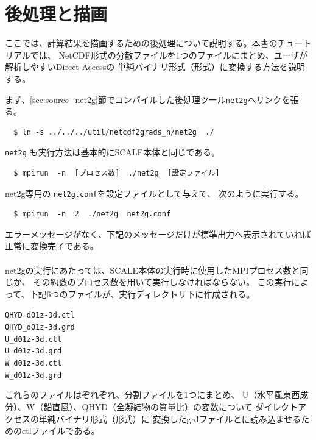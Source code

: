 \section{後処理と描画} \label{sec:ideal_exp_net2g}
ここでは、計算結果を描画するための後処理について説明する。本書のチュートリアルでは、
NetCDF形式の分散ファイルを1つのファイルにまとめ、ユーザが解析しやすいDirect-Accessの
単純バイナリ形式（\grads 形式）に変換する方法を説明する。

まず、\ref{sec:source_net2g}節でコンパイルした後処理ツール\verb|net2g|へリンクを張る。
\begin{verbatim}
  $ ln -s ../../../util/netcdf2grads_h/net2g  ./
\end{verbatim}

\verb|net2g| も実行方法は基本的にSCALE本体と同じである。
\begin{verbatim}
  $ mpirun  -n  [プロセス数]  ./net2g  [設定ファイル]
\end{verbatim}
net2g専用の \verb|net2g.conf|を設定ファイルとして与えて、
次のように実行する。
\begin{verbatim}
  $ mpirun  -n  2  ./net2g  net2g.conf
\end{verbatim}
エラーメッセージがなく、下記のメッセージだけが標準出力へ表示されていれば正常に変換完了である。\\

\\

\noindent net2gの実行にあたっては、SCALE本体の実行時に使用したMPIプロセス数と同じか、
その約数のプロセス数を用いて実行しなければならない。
この実行によって、下記6つのファイルが、実行ディレクトリ下に作成される。
\begin{alltt}
  QHYD_d01z-3d.ctl
  QHYD_d01z-3d.grd
  U_d01z-3d.ctl
  U_d01z-3d.grd
  W_d01z-3d.ctl
  W_d01z-3d.grd
\end{alltt}
これらのファイルはぞれぞれ、分割ファイルを1つにまとめ、
U（水平風東西成分）、W（鉛直風）、QHYD（全凝結物の質量比）の変数について
ダイレクトアクセスの単純バイナリ形式（\grads 形式）に
変換したgrdファイルと\grads に読み込ませるためのctlファイルである。

